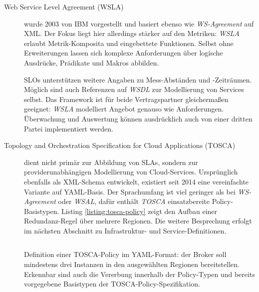 \begin{description}
	\item[Web Service Level Agreement (WSLA)] wurde 2003 von IBM vorgestellt und basiert ebenso wie \emph{WS-Agreement} auf XML. Der Fokus liegt hier allerdings stärker auf den Metriken: \emph{WSLA} erlaubt Metrik-Komposita und eingebettete Funktionen. Selbst ohne Erweiterungen lassen sich komplexe Anforderungen über logische Ausdrücke, Prädikate und Makros abbilden.
	
	SLOs unterstützen weitere Angaben zu Mess-Abständen und -Zeiträumen. Möglich sind auch Referenzen auf \emph{WSDL} zur Modellierung von Services selbst. Das Framework ist für beide Vertragspartner gleichermaßen geeignet: \emph{WSLA} modelliert Angebot genauso wie Anforderungen. Überwachung und Auswertung können ausdrücklich auch von einer dritten Partei implementiert werden.	
		
	
	
	

	\item[Topology and Orchestration Specification for Cloud Applications (TOSCA)] dient nicht primär zur Abbildung von SLAs, sondern zur providerunabhängigen Modellierung von Cloud-Services. Ursprünglich ebenfalls als XML-Schema entwickelt, existiert seit 2014 eine vereinfachte Variante auf YAML-Basis. Der Sprachumfang ist viel geringer als bei \emph{WS-Agreement} oder \emph{WSAL}, dafür enthält \emph{TOSCA} einsatzbereite Policy-Basistypen. Listing \ref{listing:tosca-policy} zeigt den Aufbau einer Redundanz-Regel über mehrere Regionen. Die weitere Besprechung erfolgt im nächsten Abschnitt zu Infrastruktur- und Service-Definitionen.
		
	\begin{listing}[]
		\inputminted[]{yaml}{./src/TOSCA.policy.sample.yaml}
		\caption{Definition einer TOSCA-Policy im YAML-Format: der Broker soll mindestens drei Instanzen in den ausgewählten Regionen bereitstellen. Erkennbar sind auch die Vererbung innerhalb der Policy-Typen und bereits vorgegebene Basistypen der TOSCA-Policy-Spezifikation.}
		\label{listing:tosca-policy}
	\end{listing}
	

\end{description}
